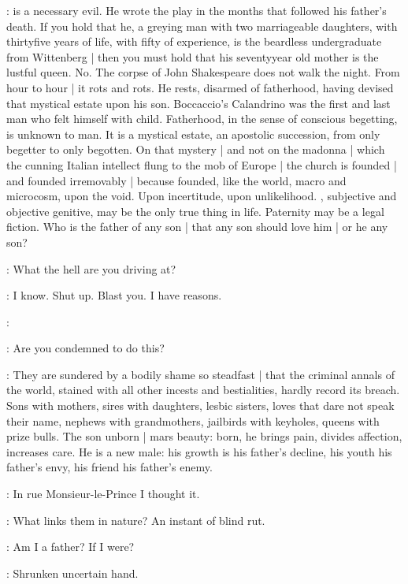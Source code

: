\Stephen:
is a necessary evil.
He wrote the play in the months that followed his father's death.
If you hold that he,
a greying man with two marriageable daughters,
with thirtyfive years of life,
with fifty of experience,
is the beardless undergraduate from Wittenberg |
then you must hold that his seventyyear old mother is the lustful queen.
No.
The corpse of John Shakespeare does not walk the night.
From hour to hour |
it rots and rots.
He rests,
disarmed of fatherhood,
having devised that mystical estate upon his son.
Boccaccio's Calandrino was the first and last man who felt himself with child.
Fatherhood, in the sense of conscious begetting,
is unknown to man.
It is a mystical estate,
an apostolic succession,
from only begetter to only begotten.
On that mystery |
and not on the madonna |
which the cunning Italian intellect flung to the mob of Europe |
the church is founded |
and founded irremovably |
because founded,
like the world,
macro and microcosm,
upon the void.
Upon incertitude,
upon unlikelihood.
,
subjective and objective genitive,
may be the only true thing in life.
Paternity may be a legal fiction.
Who is the father of any son |
that any son should love him |
or he any son?

\StephenInt:
What the hell are you driving at?

\StephenInt:
I know.
Shut up.
Blast you.
I have reasons.

\StephenInt:

\StephenInt:
Are you condemned to do this?

\Stephen:
They are sundered by a bodily shame so steadfast |
that the criminal annals of the world,
stained with all other incests and bestialities,
hardly record its breach.
Sons with mothers,
sires with daughters,
lesbic sisters,
loves that dare not speak their name,
nephews with grandmothers,
jailbirds with keyholes,
queens with prize bulls.
The son unborn |
mars beauty:
born,
he brings pain,
divides affection,
increases care.
He is a new male:
his growth is his father's decline,
his youth his father's envy,
his friend his father's enemy.

\StephenInt:
In rue Monsieur-le-Prince
I thought it.

\Stephen:
What links them in nature?
An instant of blind rut.

\StephenInt:
Am I a father?
If I were?

\StephenInt:
Shrunken uncertain hand.

